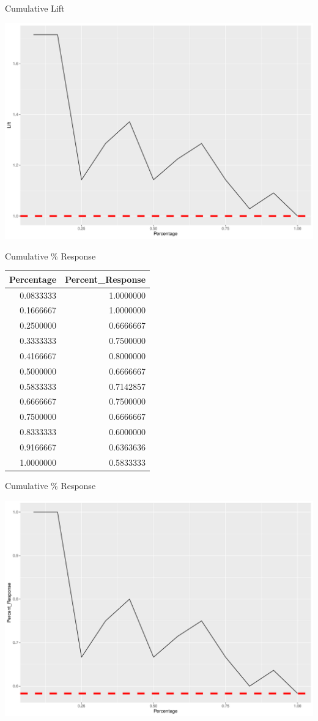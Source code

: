 \documentclass[
  ignorenonframetext,
]{beamer}
\begin{document}
\begin{frame}{Cumulative Lift}
\protect\hypertarget{cumulative-lift-8}{}

\includegraphics{fa_measuring_performance2_files/figure-beamer/unnamed-chunk-12-1.pdf}

\end{frame}

\begin{frame}{Cumulative \% Response}
\protect\hypertarget{cumulative-response}{}

\begin{longtable}[]{@{}rr@{}}
\toprule
Percentage & Percent\_Response\tabularnewline
\midrule
\endhead
0.0833333 & 1.0000000\tabularnewline
0.1666667 & 1.0000000\tabularnewline
0.2500000 & 0.6666667\tabularnewline
0.3333333 & 0.7500000\tabularnewline
0.4166667 & 0.8000000\tabularnewline
0.5000000 & 0.6666667\tabularnewline
0.5833333 & 0.7142857\tabularnewline
0.6666667 & 0.7500000\tabularnewline
0.7500000 & 0.6666667\tabularnewline
0.8333333 & 0.6000000\tabularnewline
0.9166667 & 0.6363636\tabularnewline
1.0000000 & 0.5833333\tabularnewline
\bottomrule
\end{longtable}

\end{frame}

\begin{frame}{Cumulative \% Response}
\protect\hypertarget{cumulative-response-1}{}

\includegraphics{fa_measuring_performance2_files/figure-beamer/unnamed-chunk-14-1.pdf}

\end{frame}
\end{document}
